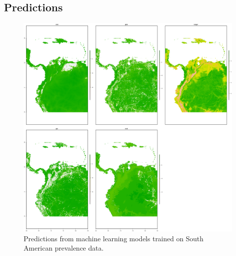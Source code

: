 \documentclass[review]{elsarticle}
\begin{document}
\subsection{Predictions}

\begin{figure}[h!]
  \centering
  \includegraphics[width=1\textwidth]{figs/SI/SA_all_ml.png}
\caption{
  Predictions from machine learning models trained on South American prevalence data.
}

\end{figure}
\end{document}
